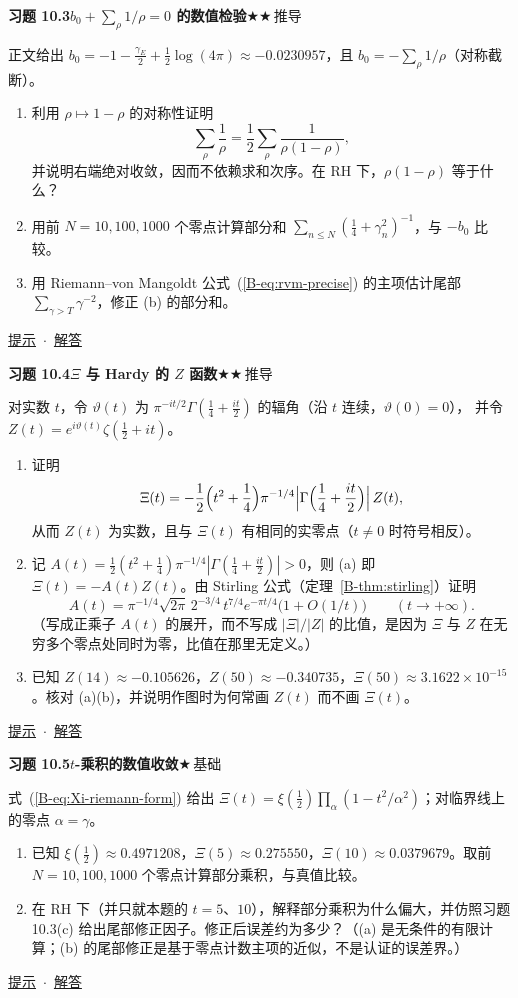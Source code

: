 \documentclass[11pt,a4paper]{article}
\newcommand{\bref}[1]{\ref*{B-#1}}
\newcommand{\lvI}{$\bigstar$\,基础}
\newcommand{\lvII}{$\bigstar\bigstar$\,推导}
\newcommand{\Q}[3]{%
  \par\addvspace{1.1em}\noindent
  \hypertarget{q:#1}{}\textbf{习题 #1}\quad\textbf{#3}\hfill{\small #2}\par
  \nopagebreak\smallskip}
\newcommand{\toHint}[1]{\hfill{\small\hyperlink{h:#1}{提示}\ $\cdot$\ \hyperlink{s:#1}{解答}}}
\begin{document}
\Q{10.3}{\lvII}{$b_0+\sum_\rho1/\rho=0$ 的数值检验}
正文给出 $b_0=-1-\frac{\gamma_E}2+\frac12\log(4\pi)\approx-0.0230957$，且 $b_0=-\sum_\rho1/\rho$（对称截断）。
\begin{enumerate}
  \item 利用 $\rho\mapsto1-\rho$ 的对称性证明
  \[
    \sum_\rho\frac1\rho=\frac12\sum_\rho\frac1{\rho(1-\rho)},
  \]
  并说明右端绝对收敛，因而不依赖求和次序。在 RH 下，$\rho(1-\rho)$ 等于什么？
  \item 用前 $N=10,100,1000$ 个零点计算部分和 $\sum_{n\le N}(\tfrac14+\gamma_n^2)^{-1}$，与 $-b_0$ 比较。
  \item 用 Riemann--von Mangoldt 公式~(\bref{eq:rvm-precise}) 的主项估计尾部 $\sum_{\gamma>T}\gamma^{-2}$，修正 (b) 的部分和。
\end{enumerate}
\toHint{10.3}

\Q{10.4}{\lvII}{$\Xi$ 与 Hardy 的 $Z$ 函数}
对实数 $t$，令 $\vartheta(t)$ 为 $\pi^{-it/2}\Gamma(\tfrac14+\tfrac{it}2)$ 的辐角（沿 $t$ 连续，$\vartheta(0)=0$），
并令 $Z(t)=e^{i\vartheta(t)}\zeta(\tfrac12+it)$。
\begin{enumerate}
  \item 证明
  \[
    \Xi(t)=-\frac12\Bigl(t^2+\frac14\Bigr)\pi^{-1/4}\Bigl|\Gamma\Bigl(\frac14+\frac{it}2\Bigr)\Bigr|\,Z(t),
  \]
  从而 $Z(t)$ 为实数，且与 $\Xi(t)$ 有相同的实零点（$t\neq0$ 时符号相反）。
  \item 记 $A(t)=\frac12(t^2+\frac14)\pi^{-1/4}|\Gamma(\frac14+\frac{it}2)|>0$，则 (a) 即 $\Xi(t)=-A(t)Z(t)$。由 Stirling 公式（定理~\bref{thm:stirling}）证明
  \[
    A(t)=\pi^{-1/4}\sqrt{2\pi}\,2^{-3/4}\,t^{7/4}e^{-\pi t/4}\bigl(1+O(1/t)\bigr)\qquad(t\to+\infty).
  \]
  （写成正乘子 $A(t)$ 的展开，而不写成 $|\Xi|/|Z|$ 的比值，是因为 $\Xi$ 与 $Z$ 在无穷多个零点处同时为零，比值在那里无定义。）
  \item 已知 $Z(14)\approx-0.105626$，$Z(50)\approx-0.340735$，$\Xi(50)\approx3.1622\times10^{-15}$。核对 (a)(b)，并说明作图时为何常画 $Z(t)$ 而不画 $\Xi(t)$。
\end{enumerate}
\toHint{10.4}

\Q{10.5}{\lvI}{$t$-乘积的数值收敛}
式~(\bref{eq:Xi-riemann-form}) 给出 $\Xi(t)=\xi(\tfrac12)\prod_\alpha(1-t^2/\alpha^2)$；对临界线上的零点 $\alpha=\gamma$。
\begin{enumerate}
  \item 已知 $\xi(\tfrac12)\approx0.4971208$，$\Xi(5)\approx0.275550$，$\Xi(10)\approx0.0379679$。取前 $N=10,100,1000$ 个零点计算部分乘积，与真值比较。
  \item 在 RH 下（并只就本题的 $t=5$、$10$），解释部分乘积为什么偏大，并仿照习题 10.3(c) 给出尾部修正因子。修正后误差约为多少？（(a) 是无条件的有限计算；(b) 的尾部修正是基于零点计数主项的近似，不是认证的误差界。）
\end{enumerate}
\toHint{10.5}
\end{document}
